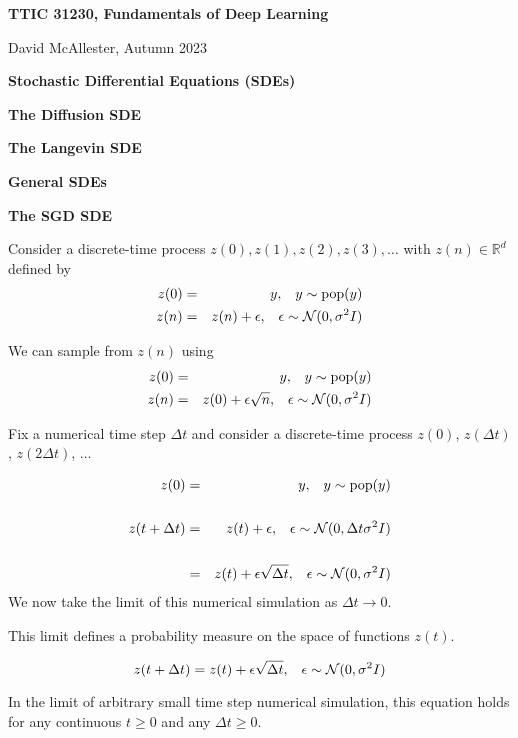 




{\Huge

\centerline{\bf TTIC 31230, Fundamentals of Deep Learning}
\bigskip
\centerline{David McAllester, Autumn 2023}
\vfill
\centerline{\bf Stochastic Differential Equations (SDEs)}
\vfill
\vfill
\centerline{\bf The Diffusion SDE}
\vfill
\centerline{\bf The Langevin SDE}
\vfill
\centerline{\bf General SDEs}
\vfill
\centerline{\bf The SGD SDE}

Consider a discrete-time process $z(0),z(1),z(2),z(3),\ldots$ with $z(n)\in \mathbb{R}^d$ defined by
\begin{eqnarray*}
  z(0) & = & y,\;\;\;y \sim \mathrm{pop}(y) \\
  z(n) & = & z(n) + \epsilon,\;\;\;\epsilon \sim {\cal N}(0,\sigma^2I)
\end{eqnarray*}

\vfill
We can sample from $z(n)$ using
\begin{eqnarray*}
  z(0) & = & y,\;\;\;y \sim \mathrm{pop}(y) \\
  z(n) & = & z(0) + \epsilon\sqrt{n} ,\;\;\;\epsilon \sim {\cal N}(0,\sigma^2I)
\end{eqnarray*}

Fix a numerical time step $\Delta t$ and consider a discrete-time process $z(0)$, $z(\Delta t)$, $z(2\Delta t)$, $\ldots$

{\huge
\begin{eqnarray*}
  z(0) & = & y,\;\;\;y \sim \mathrm{pop}(y) \\
  \\
  z(t+\Delta t) & = & z(t) + \epsilon,\;\;\;\epsilon\sim {\cal N}(0,\Delta t \sigma^2I) \\
  \\
  & = & z(t) + \epsilon\sqrt{\Delta t},\;\;\;\epsilon \sim {\cal N}(0,\sigma^2I) \\
\end{eqnarray*}
}
We now take the limit of this numerical simulation as $\Delta t \rightarrow 0$.

\vfill
This limit defines a probability measure on the space of functions $z(t)$.


$$z(t+\Delta t) =  z(t) + \epsilon\sqrt{\Delta t},\;\;\;\epsilon \sim {\cal N}(0,\sigma^2I)$$

In the limit of arbitrary small time step numerical simulation, this equation holds for any continuous $t \geq 0$
and any $\Delta t \geq 0$.

}
